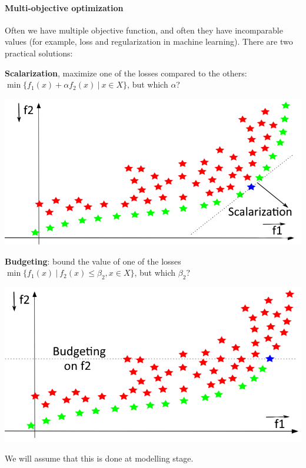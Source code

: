 \documentclass[10pt]{report}
\begin{document}
\paragraph{Multi-objective optimization} Often we have multiple objective function, and often they have incomparable values (for example, loss and regularization in machine learning). There are two practical solutions:
\begin{multicols}{2}
\textbf{Scalarization}, maximize one of the losses compared to the others: 	$\min\{f_1(x) + \alpha f_2(x)\:|\:x\in X\}$, but which $\alpha$?
\begin{center}
	\includegraphics[scale=0.33]{3.png}
\end{center}
\columnbreak
\textbf{Budgeting}: bound the value of one of the losses\\
	$\min\{f_1(x)\:|\:f_2(x)\leq \beta_2,x\in X\}$, but which $\beta_2$?
\begin{center}
	\includegraphics[scale=0.33]{4.png}
\end{center}
\end{multicols}
We will assume that this is done at modelling stage.
\end{document}
